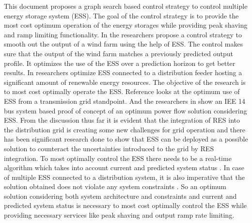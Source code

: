 \documentclass[journal,12pt,onecolumn]{IEEEtran}
\begin{document}
This document proposes a graph search based control strategy to control multiple energy storage system (ESS). The goal of the control strategy is to provide the most cost optimum operation of the energy storages while providing peak shaving and ramp limiting functionality. In \cite{IM1} the researchers propose a control strategy to smooth out the output of a wind farm using the help of ESS. The control makes sure that the output of the wind farm matches a previously predicted output profile. It optimizes the use of the ESS over a prediction horizon to get better results. In \cite{IM2} researchers optimize ESS connected to a distribution feeder hosting a significant amount of renewable energy resources. The objective of the research is to most cost optimally operate the ESS. Reference \cite{IM3} looks at the optimum use of ESS from a transmission grid standpoint. And the researchers in \cite{IM4} show an IEE 14 bus system based proof of concept of an optimum power flow solution considering ESS. From the discussion thus far it is evident that the integration of RES into the distribution grid is creating some new challenges for grid operation and there has been significant research done to show that ESS can be deployed as a possible solution to counteract the uncertainties introduced to the grid by RES integration. To most optimally control the ESS there needs to be a real-time algorithm which takes into account current and predicted system status \cite{gupta_francis_ospina_newaz_2018}. In case of multiple ESS connected to a distribution system, it is also imperative that the solution obtained does not violate any system constraints \cite{rt4}. So an optimum solution considering both system architecture and constraints and current and predicted system status is necessary to most cost optimally control the ESS while providing necessary services like peak shaving and output ramp rate limiting.
\end{document}
